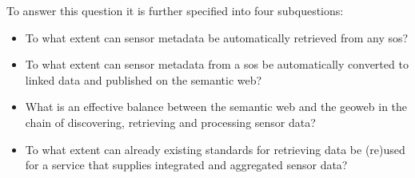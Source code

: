 To answer this question it is further specified into four subquestions:
\begin{itemize}
	\item To what extent can sensor metadata be automatically retrieved from any \acl{sos}?
	\item To what extent can sensor metadata from a \acl{sos} be automatically converted to linked data and published on the semantic web?
	\item  What is an effective balance between the semantic web and the geoweb in the chain of discovering, retrieving and processing sensor data?
	\item To what extent can already existing standards for retrieving data be (re)used for a service that supplies integrated and aggregated sensor data?
\end{itemize}

